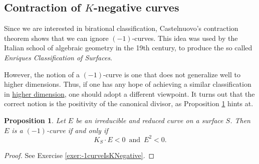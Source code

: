 \documentclass[a4paper,11pt]{amsart}
\newtheorem{proposition}[theorem]{Proposition}
\newcommand{\OO}{\mathcal{O}}
\begin{document}
\subsection{Contraction of $K$-negative curves}



Since we are interested in birational classification, Castelnuovo's contraction theorem shows that we can ignore $(-1)$-curves.
This idea was used by the Italian school of algebraic geometry in the 19th century, to produce the so called \emph{Enriques Classification of Surfaces}.

However, the notion of a $(-1)$-curve is one that does not generalize well to higher dimensions.
Thus, if one has any hope of achieving a similar classification in \href{https://s-zikas.github.io/site/pics/curves%26Surfaces.png}{higher dimension}, one should adopt a different viewpoint.
It turns out that the correct notion is the positivity of the canonical divisor, as Proposition \ref{prop:-1curveIsKNegative} hints at.



\begin{comment}
\begin{proof}
	From the Riemann-Roch theorem we have
	\begin{equation}\label{eq:AGF1}
		\chi(S,\OO_X(-C)) = \frac{(K_S + C)\cdot C}{2} + \chi(\OO_S).
	\end{equation}
	From the structure sequence 
	\[
	0 \to \OO_S(-C) \to \OO_S \to \OO_C \to 0
	\]
	and the fact that the Euler characteristic is additive in short exact sequences, we have
	\begin{equation}\label{eq:AGF2}
		\chi(\OO_S) - \chi(\OO_S(-C)) = \chi(\OO_C) = h^0(C,\OO_C) - h^1(C,\OO_C) = 1 -h^1(C,\OO_C).
	\end{equation}
	By \eqref{eq:AGF1} and \eqref{eq:AGF2} we get the result.
\end{proof}
\end{comment}


\begin{proposition}\label{prop:-1curveIsKNegative}
	Let $E$ be an irreducible and reduced curve on a surface $S$.
	Then $E$ is a $(-1)$-curve \emph{if and only if} 
	\[
	K_S\cdot E < 0  \, \text{ and } \, E^2<0.
	\]
\end{proposition}
 
\begin{proof}
	See Exercise \ref{exer:-1curveIsKNegative}.
\end{proof}
\end{document}
